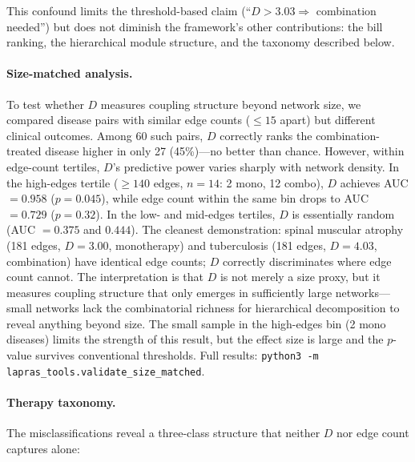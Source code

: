 \documentclass[11pt,a4paper]{article}
\begin{document}
This confound limits the threshold-based claim (``$D > 3.03 \Rightarrow$ combination needed'') but does not diminish the framework's other contributions: the bill ranking, the hierarchical module structure, and the taxonomy described below.

\paragraph{Size-matched analysis.} To test whether $D$ measures coupling structure beyond network size, we compared disease pairs with similar edge counts ($\leq 15$ apart) but different clinical outcomes. Among 60 such pairs, $D$ correctly ranks the combination-treated disease higher in only 27 (45\%)---no better than chance. However, within edge-count tertiles, $D$'s predictive power varies sharply with network density. In the high-edges tertile ($\geq 140$ edges, $n = 14$: 2 mono, 12 combo), $D$ achieves AUC $= 0.958$ ($p = 0.045$), while edge count within the same bin drops to AUC $= 0.729$ ($p = 0.32$). In the low- and mid-edges tertiles, $D$ is essentially random (AUC $= 0.375$ and $0.444$). The cleanest demonstration: spinal muscular atrophy (181 edges, $D = 3.00$, monotherapy) and tuberculosis (181 edges, $D = 4.03$, combination) have identical edge counts; $D$ correctly discriminates where edge count cannot. The interpretation is that $D$ is not merely a size proxy, but it measures coupling structure that only emerges in sufficiently large networks---small networks lack the combinatorial richness for hierarchical decomposition to reveal anything beyond size. The small sample in the high-edges bin (2 mono diseases) limits the strength of this result, but the effect size is large and the $p$-value survives conventional thresholds. Full results: \texttt{python3 -m lapras\_tools.validate\_size\_matched}.

\paragraph{Therapy taxonomy.} The misclassifications reveal a three-class structure that neither $D$ nor edge count captures alone:
\end{document}
